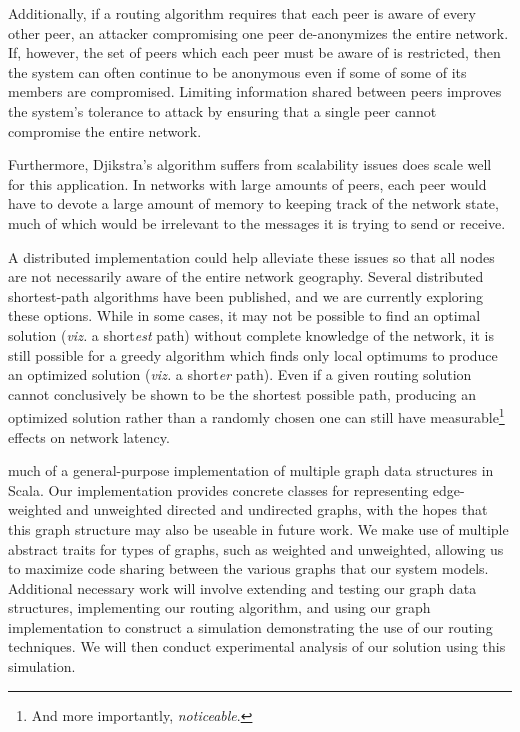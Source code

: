 \documentclass[nobib]{tufte-handout}
\begin{document}
Additionally, if a routing algorithm requires that each peer is aware of every other peer, an attacker compromising one peer de-anonymizes the entire network. If, however, the set of peers which each peer must be aware of is restricted,  then the system can often continue to be anonymous even if some of some of its members are compromised. Limiting information shared between peers improves the system's tolerance to attack by ensuring that a single peer cannot compromise the entire network.

Furthermore, Djikstra's algorithm suffers from scalability issues does scale well for this application. In networks with large amounts of peers, each peer would have to devote a large amount of memory to keeping track of the network state, much of which would be irrelevant to the messages it is trying to send or receive.

A distributed implementation could help alleviate these issues so that all nodes are not necessarily aware of the entire network geography. Several distributed shortest-path algorithms have been published, and we are currently exploring these options.\autocite{zaumen1991SIGCOMM,humblet1988adaptive,humblet1991another,Gallager:1983:DAM:357195.357200} While in some cases, it may not be possible to find an optimal solution (\textit{viz.} a short\textit{est} path) without complete knowledge of the network, it is still possible for a greedy algorithm which finds only local optimums to produce an optimized solution (\textit{viz.} a short\textit{er} path). Even if a given routing solution cannot conclusively be shown to be the shortest possible path, producing an optimized solution rather than a randomly chosen one can still have measurable\footnote{And more importantly, \textit{noticeable}.} effects on network latency.

 much of a general-purpose implementation of multiple graph data structures in Scala. Our implementation provides concrete classes for representing edge-weighted and unweighted directed and undirected graphs, with the hopes that this graph structure may also be useable in future work. We make use of multiple abstract traits for types of graphs, such as weighted and unweighted, allowing us to maximize code sharing between the various graphs that our system models.
Additional necessary work will involve extending and testing our graph data structures, implementing our routing algorithm, and using our graph implementation to construct a simulation demonstrating the use of our routing techniques. We will then conduct experimental analysis of our solution using this simulation.

% 
% 
\printbibliography
\end{document}
